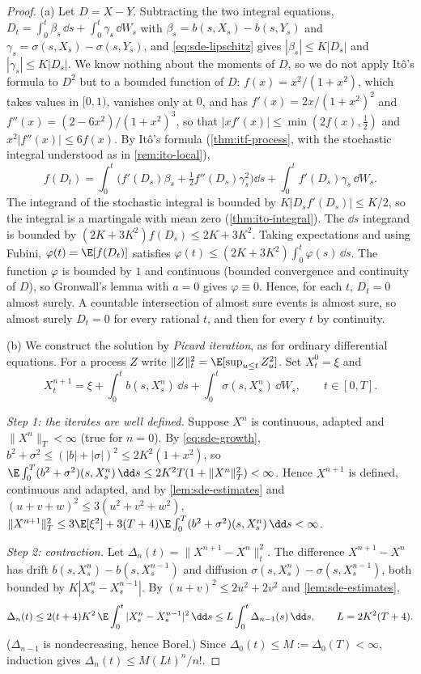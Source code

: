 \begin{proof}
(a) Let $D=X-Y$. Subtracting the two integral equations,
$D_t=\int_0^t\beta_s\,\dd s+\int_0^t\gamma_s\,\dd W_s$ with
$\beta_s=b(s,X_s)-b(s,Y_s)$ and $\gamma_s=\sigma(s,X_s)-\sigma(s,Y_s)$, and
\eqref{eq:sde-lipschitz} gives $|\beta_s|\le K|D_s|$ and $|\gamma_s|\le K|D_s|$. We know
nothing about the moments of $D$, so we do not apply It\^o's formula to $D^2$ but to a
bounded function of $D$: $f(x)=x^2/(1+x^2)$, which takes values in $[0,1)$, vanishes only at
$0$, and has $f'(x)=2x/(1+x^2)^2$ and $f''(x)=(2-6x^2)/(1+x^2)^3$, so that
$|xf'(x)|\le\min(2f(x),\frac12)$ and $x^2|f''(x)|\le6f(x)$.
By It\^o's formula (\cref{thm:itf-process}, with the stochastic integral understood as in
\cref{rem:ito-local}),
\[
  f(D_t)=\int_0^t\Big(f'(D_s)\beta_s+\tfrac12f''(D_s)\gamma_s^2\Big)\dd s
  +\int_0^tf'(D_s)\gamma_s\,\dd W_s .
\]
The integrand of the stochastic integral is bounded by $K|D_sf'(D_s)|\le K/2$, so the
integral is a martingale with mean zero (\cref{thm:ito-integral}). The $\dd s$ integrand is
bounded by $(2K+3K^2)f(D_s)\le2K+3K^2$. Taking expectations and using Fubini,
$\varphi(t)=\E[f(D_t)]$ satisfies $\varphi(t)\le(2K+3K^2)\int_0^t\varphi(s)\,\dd s$. The
function $\varphi$ is bounded by $1$ and continuous (bounded convergence and continuity of
$D$), so Gronwall's lemma with $a=0$ gives $\varphi\equiv0$. Hence, for each $t$, $D_t=0$
almost surely. A countable intersection of almost sure events is almost sure, so almost
surely $D_t=0$ for every rational $t$, and then for every $t$ by continuity.

(b) We construct the solution by \emph{Picard iteration}, as for ordinary differential
equations. For a process $Z$ write $\|Z\|_t^2=\E[\sup_{u\le t}Z_u^2]$. Set $X^0_t=\xi$ and
\[
  X^{n+1}_t=\xi+\int_0^tb(s,X^n_s)\,\dd s+\int_0^t\sigma(s,X^n_s)\,\dd W_s,\qquad t\in[0,T].
\]

\emph{Step 1: the iterates are well defined.} Suppose $X^n$ is continuous, adapted and
$\|X^n\|_T<\infty$ (true for $n=0$). By \eqref{eq:sde-growth},
$b^2+\sigma^2\le(|b|+|\sigma|)^2\le2K^2(1+x^2)$, so
$\E\int_0^T(b^2+\sigma^2)(s,X^n_s)\,\dd s\le2K^2T(1+\|X^n\|_T^2)<\infty$. Hence $X^{n+1}$ is
defined, continuous and adapted, and by \cref{lem:sde-estimates} and
$(u+v+w)^2\le3(u^2+v^2+w^2)$,
$\|X^{n+1}\|_T^2\le3\E[\xi^2]+3(T+4)\E\int_0^T(b^2+\sigma^2)(s,X^n_s)\,\dd s<\infty$.

\emph{Step 2: contraction.} Let $\Delta_n(t)=\|X^{n+1}-X^n\|_t^2$. The difference
$X^{n+1}-X^n$ has drift $b(s,X^n_s)-b(s,X^{n-1}_s)$ and diffusion
$\sigma(s,X^n_s)-\sigma(s,X^{n-1}_s)$, both bounded by $K|X^n_s-X^{n-1}_s|$. By
$(u+v)^2\le2u^2+2v^2$ and \cref{lem:sde-estimates},
\[
  \Delta_n(t)\le2(t+4)K^2\,\E\int_0^t|X^n_s-X^{n-1}_s|^2\,\dd s\le L\int_0^t\Delta_{n-1}(s)\,\dd s,
  \qquad L=2K^2(T+4).
\]
($\Delta_{n-1}$ is nondecreasing, hence Borel.) Since $\Delta_0(t)\le M:=\Delta_0(T)<\infty$,
induction gives $\Delta_n(t)\le M(Lt)^n/n!$.


\end{proof}
